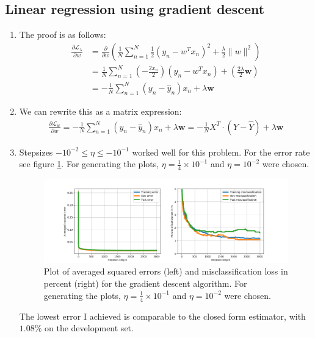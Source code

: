 \documentclass[12pt]{article}
\begin{document}
\subsection{Linear regression using gradient descent}

\begin{enumerate}
	\item The proof is as follows:
		\begin{align*}
			\frac{\partial \mathcal{L}_\lambda}{\partial w} &= \frac{\partial}{\partial w} \left( \frac{1}{N} \sum_{n=1}^{N} \frac{1}{2} \left( y_n - w^Tx_n \right)^2 + \frac{\lambda}{2} \lVert w \rVert^2 \right) \\
			&= \frac{1}{N} \sum_{n=1}^{N} \left( -\frac{2x_n}{2} \right) \left( y_n - w^Tx_n \right) + \left( \frac{2\lambda}{2} \textbf{w}  \right) \\
			&= -\frac{1}{N} \sum_{n=1}^{N} \left( y_n - \hat{y}_n \right) x_n + \lambda \textbf{w}
		\end{align*}
	\item We can rewrite this as a matrix expression:
		\begin{align*}
			\frac{\partial \mathcal{L}_w}{\partial w} = -\frac{1}{N} \sum_{n=1}^{N} \left( y_n - \hat{y}_n \right) x_n + \lambda \textbf{w} = - \frac{1}{N} X^T \cdot \left( Y - \hat{Y} \right) + \lambda \textbf{w}
		\end{align*}
	\item Stepsizes $ -10^{-2} \leq \eta \leq -10^{-1} $ worked well for this problem. For the error rate see figure \ref{fig:1.2}. For generating the plots, $\eta = \frac{1}{4}\times 10^{-1}$ and $\eta=10^{-2}$ were chosen.
		\begin{figure}[h!]
			\centering
			\includegraphics[width=\linewidth]{./Problem_1/Problem_1.2.png}
			\caption{Plot of averaged squared errors (left) and misclassification loss in percent (right) for the gradient descent algorithm. For generating the plots, $\eta = \frac{1}{4}\times 10^{-1}$ and $\eta=10^{-2}$ were chosen.}
			\label{fig:1.2}
		\end{figure}
	The lowest error I achieved is comparable to the closed form estimator, with $1.08\%$ on the development set. 
\end{enumerate}
\end{document}
